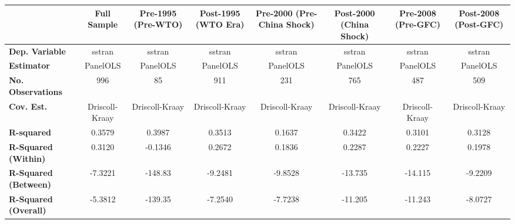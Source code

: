 \begin{center}
\begin{tabular}{lccccccc}
\toprule
                                   & \textbf{Full Sample} & \textbf{Pre-1995 (Pre-WTO)} & \textbf{Post-1995 (WTO Era)} & \textbf{Pre-2000 (Pre-China Shock)} & \textbf{Post-2000 (China Shock)} & \textbf{Pre-2008 (Pre-GFC)} & \textbf{Post-2008 (Post-GFC)}  \\
\midrule
\textbf{Dep. Variable}             &        sstran        &            sstran           &            sstran            &                sstran               &              sstran              &            sstran           &             sstran             \\
\textbf{Estimator}                 &       PanelOLS       &           PanelOLS          &           PanelOLS           &               PanelOLS              &             PanelOLS             &           PanelOLS          &            PanelOLS            \\
\textbf{No. Observations}          &         996          &              85             &             911              &                 231                 &               765                &             487             &              509               \\
\textbf{Cov. Est.}                 &    Driscoll-Kraay    &        Driscoll-Kraay       &        Driscoll-Kraay        &            Driscoll-Kraay           &          Driscoll-Kraay          &        Driscoll-Kraay       &         Driscoll-Kraay         \\
\textbf{R-squared}                 &        0.3579        &            0.3987           &            0.3513            &                0.1637               &              0.3422              &            0.3101           &             0.3128             \\
\textbf{R-Squared (Within)}        &        0.3120        &           -0.1346           &            0.2672            &                0.1836               &              0.2287              &            0.2227           &             0.1978             \\
\textbf{R-Squared (Between)}       &       -7.3221        &           -148.83           &           -9.2481            &               -9.8528               &             -13.735              &           -14.115           &            -9.2209             \\
\textbf{R-Squared (Overall)}       &       -5.3812        &           -139.35           &           -7.2540            &               -7.7238               &             -11.205              &           -11.243           &            -8.0727             \\

\end{tabular}
\end{center}
